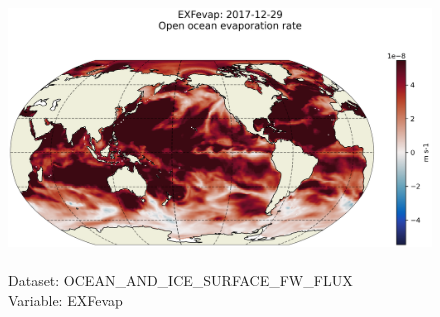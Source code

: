 \begin{figure}[H]
\centering
\includegraphics[scale=0.5]{../images/plots/latlon_plots/Ocean_and_Sea-Ice_Surface_Freshwater_Fluxes/EXFevap.png}
\caption{\\Dataset: OCEAN\_AND\_ICE\_SURFACE\_FW\_FLUX\\Variable: EXFevap}
\label{tab:table-OCEAN_AND_ICE_SURFACE_FW_FLUX_EXFevap-Plot}
\end{figure}
\pagebreak
